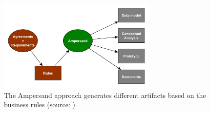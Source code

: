\begin{figure}[htb]
	\centering
	\includegraphics[width=0.7\textwidth]{Figures/Generation}
	\caption[Generated artifacts]{The Ampersand approach generates different artifacts based on the business rules (source: \cite{ampersand-approach})}
	\label{fig:generation}
\end{figure}

